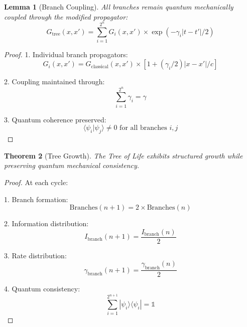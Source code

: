 \documentclass{article}
\newtheorem{theorem}{Theorem}
\newtheorem{lemma}[theorem]{Lemma}
\begin{document}
\begin{lemma}[Branch Coupling]
All branches remain quantum mechanically coupled through the modified propagator:
\begin{equation}
G_{\text{tree}}(x,x') = \sum_{i=1}^{2^{n}} G_i(x,x') \times \exp(-\gamma_i|t-t'|/2)
\end{equation}
\end{lemma}

\begin{proof}
1. Individual branch propagators:
   \begin{equation}
   G_i(x,x') = G_{\text{classical}}(x,x') \times [1 + (\gamma_i/2)|x-x'|/c]
   \end{equation}

2. Coupling maintained through:
   \begin{equation}
   \sum_{i=1}^{2^{n}} \gamma_i = \gamma
   \end{equation}

3. Quantum coherence preserved:
   \begin{equation}
   \langle\psi_i|\psi_j\rangle \neq 0 \text{ for all branches } i,j
   \end{equation}
\end{proof}

\begin{theorem}[Tree Growth]
The Tree of Life exhibits structured growth while preserving quantum mechanical consistency.
\end{theorem}

\begin{proof}
At each cycle:

1. Branch formation:
   \begin{equation}
   \text{Branches}(n+1) = 2 \times \text{Branches}(n)
   \end{equation}

2. Information distribution:
   \begin{equation}
   I_{\text{branch}}(n+1) = \frac{I_{\text{branch}}(n)}{2}
   \end{equation}

3. Rate distribution:
   \begin{equation}
   \gamma_{\text{branch}}(n+1) = \frac{\gamma_{\text{branch}}(n)}{2}
   \end{equation}

4. Quantum consistency:
   \begin{equation}
   \sum_{i=1}^{2^{n+1}} |\psi_i\rangle\langle\psi_i| = \mathbb{1}
   \end{equation}
\end{proof}
\end{document}
